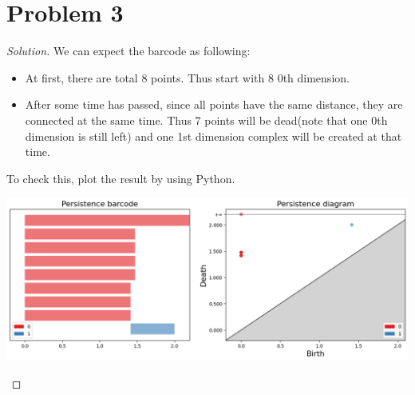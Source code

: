 \section*{Problem 3}
	\begin{proof} [Solution]
		We can expect the barcode as following:
		\begin{itemize}
			\item At first, there are total 8 points. Thus start with 8 0th dimension.
			\item After some time has passed, since all points have the same distance, they are connected at the same time. Thus 7 points will be dead(note that one 0th dimension is still left) and one 1st dimension complex will be created at that time.
		\end{itemize}
		To check this, plot the result by using Python.
		\begin{center}
			\includegraphics[width=\textwidth]{persis.png}
		\end{center}
	\end{proof}